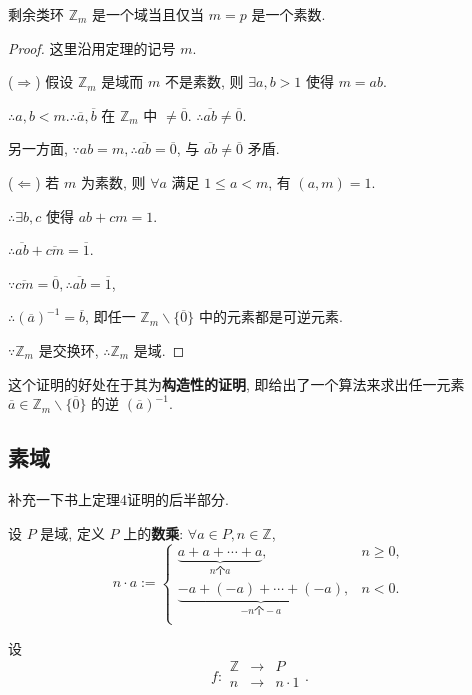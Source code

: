 \documentclass{ctexart}
\begin{document}
\begin{theorem}[书上的定理3]
    剩余类环 $\mathbb{Z}_m$ 是一个域当且仅当 $m=p$ 是一个素数.
\end{theorem}
\begin{proof}
    这里沿用定理的记号 $m$.

    ($\Rightarrow$) 假设 $\mathbb{Z}_m$ 是域而 $m$ 不是素数, 则 $\exists a,b>1$ 使得 $m=ab$.

    $\therefore a,b<m.\therefore\overline{a},\overline{b}$ 在 $\mathbb{Z}_m$ 中 $\neq\overline{0}$. $\therefore\overline{ab}\neq\overline{0}$.

    另一方面, $\because ab=m,\therefore\overline{ab}=\overline{0}$, 与 $\overline{ab}\neq\overline{0}$ 矛盾.

    ($\Leftarrow$) 若 $m$ 为素数, 则 $\forall a$ 满足 $1\leq a<m$, 有 $(a,m)=1$.

    $\therefore\exists b,c$ 使得 $ab+cm=1$.

    $\therefore\overline{ab}+\overline{cm}=\overline{1}$.

    $\because\overline{cm}=\overline{0},\therefore\overline{ab}=\overline{1}$,

    $\therefore(\overline{a})^{-1}=\overline{b}$, 即任一 $\mathbb{Z}_m\backslash\{\overline{0}\}$ 中的元素都是可逆元素.

    $\because\mathbb{Z}_m$ 是交换环, $\therefore\mathbb{Z}_m$ 是域.
\end{proof}
这个证明的好处在于其为\textbf{构造性的证明}, 即给出了一个算法来求出任一元素 $\overline{a}\in\mathbb{Z}_m\backslash\{\overline{0}\}$ 的逆 $(\overline{a})^{-1}$.
\subsection{素域}
补充一下书上定理4证明的后半部分.

设 $P$ 是域, 定义 $P$ 上的\textbf{数乘}: $\forall a\in P,n\in\mathbb{Z}$,
\[n\cdot a:=\begin{cases}
    \underbrace{a+a+\cdots+a}_{n\text{个}a}, & n\geq0, \\
    \underbrace{-a+(-a)+\cdots+(-a)}_{-n\text{个}-a}, & n<0. \\
\end{cases}\]

设
\[f:\begin{array}{rcl}
    \mathbb{Z} & \to & P \\
    n & \to & n\cdot1 \\
\end{array}.\]
\end{document}
